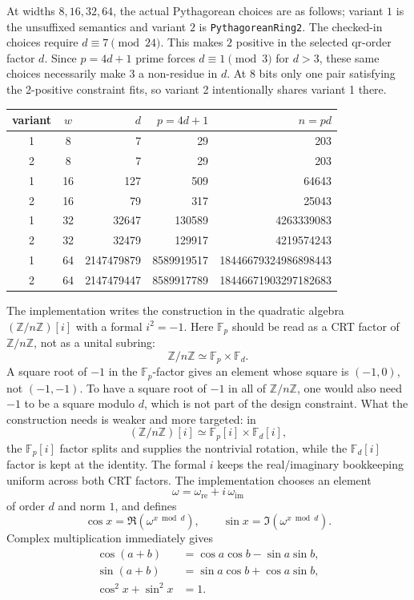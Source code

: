 \documentclass[11pt]{article}
\newcommand{\Z}{\mathbb{Z}}
\newcommand{\F}{\mathbb{F}}
\theoremstyle{plain}
\begin{document}
At widths \(8,16,32,64\), the actual Pythagorean choices are as follows; variant
\(1\) is the unsuffixed semantics and variant \(2\) is
\texttt{PythagoreanRing2}.  The checked-in choices require
\(d\equiv7\pmod {24}\).  This makes \(2\) positive in the selected qr-order
factor \(d\).  Since \(p=4d+1\) prime forces \(d\equiv1\pmod 3\) for
\(d>3\), these same choices necessarily make \(3\) a non-residue in \(d\).  At
8 bits only one pair satisfying the 2-positive constraint fits, so variant 2
intentionally shares variant 1 there.
\begin{center}
\small
\begin{tabular}{c|c|r|r|r}
variant & \(w\) & \(d\) & \(p=4d+1\) & \(n=pd\)\\
\hline
1 & 8  & 7 & 29 & 203\\
2 & 8  & 7 & 29 & 203\\
1 & 16 & 127 & 509 & 64643\\
2 & 16 & 79 & 317 & 25043\\
1 & 32 & 32647 & 130589 & 4263339083\\
2 & 32 & 32479 & 129917 & 4219574243\\
1 & 64 & 2147479879 & 8589919517 & 18446679324986898443\\
2 & 64 & 2147479447 & 8589917789 & 18446671903297182683
\end{tabular}
\end{center}

The implementation writes the construction in the quadratic algebra
\((\Z/n\Z)[i]\) with a formal \(i^2=-1\).  Here
\(\F_p\) should be read as a CRT factor of \(\Z/n\Z\), not as a unital subring:
\[
  \Z/n\Z \simeq \F_p\times \F_d.
\]
A square root of \(-1\) in the \(\F_p\)-factor gives an element whose square is
\((-1,0)\), not \((-1,-1)\).  To have a square root of \(-1\) in all of
\(\Z/n\Z\), one would also need \(-1\) to be a square modulo \(d\), which is not
part of the design constraint.  What the construction needs is weaker and more
targeted: in
\[
  (\Z/n\Z)[i]\simeq \F_p[i]\times\F_d[i],
\]
the \(\F_p[i]\) factor splits and supplies the nontrivial rotation, while the
\(\F_d[i]\) factor is kept at the identity.  The formal \(i\) keeps the
real/imaginary bookkeeping uniform across both CRT factors.  The implementation
chooses an element
\[
  \omega=\omega_{\mathrm{re}}+i\,\omega_{\mathrm{im}}
\]
of order \(d\) and norm \(1\), and defines
\[
  \cos x = \Re(\omega^{x\bmod d}),\qquad
  \sin x = \Im(\omega^{x\bmod d}).
\]
Complex multiplication immediately gives
\[
\begin{aligned}
  \cos(a+b) &= \cos a\cos b-\sin a\sin b,\\
  \sin(a+b) &= \sin a\cos b+\cos a\sin b,\\
  \cos^2 x+\sin^2 x &= 1.
\end{aligned}
\]
\end{document}

